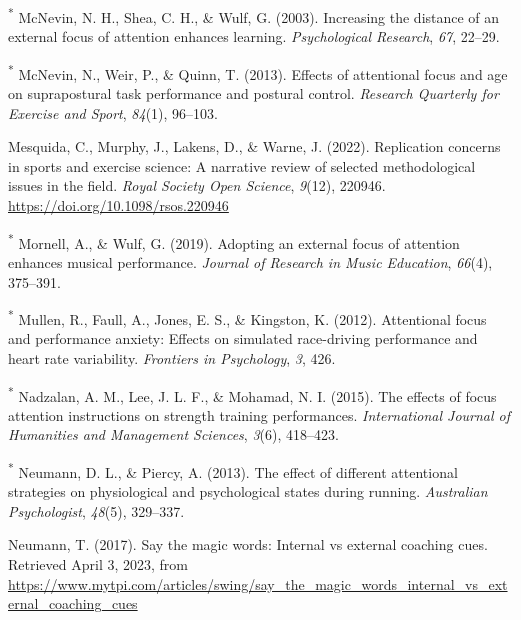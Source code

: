 \documentclass[
  man, donotrepeattitle,floatsintext]{apa7}
\newlength{\cslhangindent}
\newlength{\cslentryspacingunit} %
\newenvironment{CSLReferences}[2] %
 {%
  \setlength{\parindent}{0pt}
  \ifodd #1
  \let\oldpar\par
  \def\par{\hangindent=\cslhangindent\oldpar}
  \fi
  \setlength{\parskip}{#2\cslentryspacingunit}
 }%
 {}
\begin{document}
\begin{CSLReferences}{1}{0}
\leavevmode{}%
\textsuperscript{*} McNevin, N. H., Shea, C. H., \& Wulf, G. (2003). Increasing the distance of an external focus of attention enhances learning. \emph{Psychological Research}, \emph{67}, 22--29.

\leavevmode{}%
\textsuperscript{*} McNevin, N., Weir, P., \& Quinn, T. (2013). Effects of attentional focus and age on suprapostural task performance and postural control. \emph{Research Quarterly for Exercise and Sport}, \emph{84}(1), 96--103.

\leavevmode{}%
Mesquida, C., Murphy, J., Lakens, D., \& Warne, J. (2022). Replication concerns in sports and exercise science: A narrative review of selected methodological issues in the field. \emph{Royal Society Open Science}, \emph{9}(12), 220946. \url{https://doi.org/10.1098/rsos.220946}

\leavevmode{}%
\textsuperscript{*} Mornell, A., \& Wulf, G. (2019). Adopting an external focus of attention enhances musical performance. \emph{Journal of Research in Music Education}, \emph{66}(4), 375--391.

\leavevmode{}%
\textsuperscript{*} Mullen, R., Faull, A., Jones, E. S., \& Kingston, K. (2012). Attentional focus and performance anxiety: Effects on simulated race-driving performance and heart rate variability. \emph{Frontiers in Psychology}, \emph{3}, 426.

\leavevmode{}%
\textsuperscript{*} Nadzalan, A. M., Lee, J. L. F., \& Mohamad, N. I. (2015). The effects of focus attention instructions on strength training performances. \emph{International Journal of Humanities and Management Sciences}, \emph{3}(6), 418--423.

\leavevmode{}%
\textsuperscript{*} Neumann, D. L., \& Piercy, A. (2013). The effect of different attentional strategies on physiological and psychological states during running. \emph{Australian Psychologist}, \emph{48}(5), 329--337.

\leavevmode{}%
Neumann, T. (2017). Say the magic words: {Internal} vs external coaching cues. Retrieved April 3, 2023, from \url{https://www.mytpi.com/articles/swing/say_the_magic_words_internal_vs_external_coaching_cues}


\end{CSLReferences}
\end{document}
